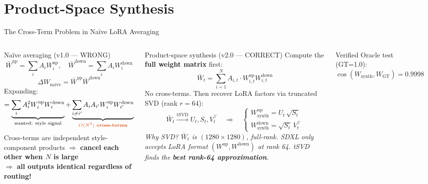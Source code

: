 \documentclass[aspectratio=169,10pt]{beamer}
\newcommand{\highlight}[1]{\textcolor{myorange}{\textbf{#1}}}
\begin{document}
\section{Product-Space Synthesis}

\begin{frame}[shrink=20]{The Cross-Term Problem in Na\"ive LoRA Averaging}
  \begin{columns}[T]
      \begin{alertblock}{Naïve averaging (v1.0 — WRONG)}
        \[
          \bar{W}^\text{up} = \sum_i A_i W^\text{up}_i, \quad
          \bar{W}^\text{down} = \sum_i A_i W^\text{down}_i
        \]
        \[
          \Delta W_\text{naive} = \bar{W}^\text{up} \bar{W}^\text{down}
        \]
        Expanding:
        \[
          = \underbrace{\sum_i A_i^2 W^\text{up}_i W^\text{down}_i}_{\text{wanted: style signal}}
            + \underbrace{\sum_{i \neq i'} A_i A_{i'} W^\text{up}_i W^\text{down}_{i'}}_{\highlight{$O(N^2)$ cross-terms}}
        \]
        Cross-terms are independent style-component products
        $\Rightarrow$ \textbf{cancel each other when $N$ is large}\\
        $\Rightarrow$ \highlight{all outputs identical regardless of routing!}
      \end{alertblock}

      \begin{exampleblock}{Product-space synthesis (v2.0 — CORRECT)}
        Compute the \textbf{full weight matrix} first:
        \[
          \bar{W}_t = \sum_{i=1}^{N} A_{i,t} \cdot W^\text{up}_{i,t} W^\text{down}_{i,t}
        \]
        No cross-terms. Then recover LoRA factors via truncated SVD (rank $r=64$):
        \[
          \bar{W}_t \xrightarrow{\text{tSVD}} U_t, S_t, V_t^\top \quad\Rightarrow\quad
          \begin{cases}
            W^\text{up}_\text{synth} = U_t\,\sqrt{S_t} \\
            W^\text{down}_\text{synth} = \sqrt{S_t}\,V_t^\top
          \end{cases}
        \]
        \footnotesize\textit{Why SVD? $\bar{W}_t$ is $(1280\!\times\!1280)$, full-rank.  SDXL only accepts LoRA format $(W^\text{up}, W^\text{down})$ at rank 64.  tSVD finds the \textbf{best rank-64 approximation}.}
      \end{exampleblock}
      \begin{block}{Verified}
        \footnotesize Oracle test (GT=1.0): $\cos(W_\text{synth}, W_\text{GT}) = 0.9998$
      \end{block}
  \end{columns}
\end{frame}
\end{document}
